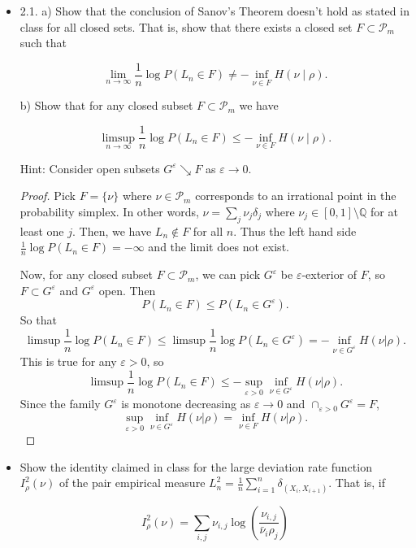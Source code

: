 
\begin{itemize}
	\item
		2.1. a) Show that the conclusion of Sanov's Theorem doesn't hold as stated in class for all closed sets. That is, show that there exists a closed set $F \subset \mathcal{P}_m$ such that

\[
\lim _{n \rightarrow \infty} \frac{1}{n} \log P\left(L_n \in F\right) \neq-\inf _{\nu \in F} H(\nu \mid \rho) .
\]

b) Show that for any closed subset $F \subset \mathcal{P}_m$ we have

\[
\limsup _{n \rightarrow \infty} \frac{1}{n} \log P\left(L_n \in F\right) \leq-\inf _{\nu \in F} H(\nu \mid \rho) .
\]


Hint: Consider open subsets $G^{\varepsilon} \searrow F$ as $\varepsilon \rightarrow 0$.
\begin{proof}
	Pick $F = \{\nu\} $ where $\nu \in \mathcal{P}_m$ corresponds to an irrational point in the probability simplex. In other words, $\nu = \sum_j \nu_j \delta_j$ where $\nu_j \in [0,1]\setminus \mathbb{Q}$ for at least one $j$. Then, we have $L_n \not\in F$ for all $n$.  Thus the left hand side $\frac{1}{n} \log P(L_n \in F) = - \infty $ and the limit does not exist.

	Now, for any closed subset $F \subset \mathcal{P}_m$, we can pick $G^\varepsilon$ be $\varepsilon$-exterior of $F$, so $F \subset G^\varepsilon$ and $G^\varepsilon$ open.
	Then
	\[
		P(L_n \in F) \le P(L_n \in G^\varepsilon)
	.\] 
	So that
	\[
		\limsup \frac{1}{n} \log P(L_n \in F) \le 
		\limsup \frac{1}{n} \log P(L_n \in G^\varepsilon) =
		- \inf_{\nu \in G^\varepsilon} H(\nu | \rho)
	.\] 
	This is true for any $\varepsilon > 0$, so
	\[
		\limsup \frac{1}{n} \log P(L_n \in F) \le 
		- \sup  _{\varepsilon > 0} \inf _{\nu \in G^\varepsilon} H(\nu | \rho)
	.\] 
	Since the family $G^\varepsilon$ is monotone decreasing as $\varepsilon \to 0$ and $\cap_{\varepsilon > 0} G^\varepsilon = F$,
	\[
		\sup  _{\varepsilon > 0} \inf _{\nu \in G^\varepsilon} H(\nu | \rho) = \inf _{\nu \in F} H(\nu | \rho)
	.\] 
\end{proof}

\item 
	Show the identity claimed in class for the large deviation rate function $I_\rho^2(\nu)$ of the pair empirical measure $L_n^2=\frac{1}{n} \sum_{i=1}^n \delta_{\left(X_i, X_{i+1}\right)}$. That is, if

\[
I_\rho^2(\nu)=\sum_{i, j} \nu_{i, j} \log \left(\frac{\nu_{i, j}}{\bar{\nu}_i \rho_j}\right)
\]


\end{itemize}
